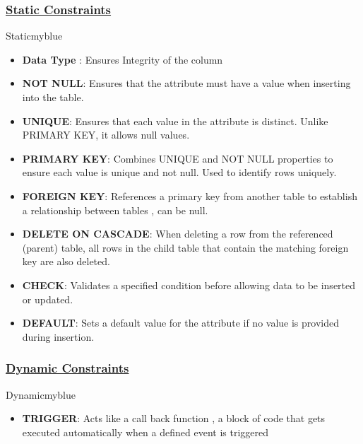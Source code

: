 \subsubsection{\underline{Static Constraints}}

\vspace{0.25cm}
\begin{prettyBox}{Static}{myblue}
\begin{itemize} 
\item \textbf{Data Type} : Ensures Integrity of the column
\item \textbf{NOT NULL}: Ensures that the attribute must have a value when inserting into the table.
\item \textbf{UNIQUE}: Ensures that each value in the attribute is distinct. Unlike PRIMARY KEY, it allows null values.
\item \textbf{PRIMARY KEY}: Combines UNIQUE and NOT NULL properties to ensure each value is unique and not null.
Used to identify rows uniquely. 
\item \textbf{FOREIGN KEY}: References a primary key from another table to establish a relationship between tables , can be null.
\item \textbf{DELETE ON CASCADE}: When deleting a row from the referenced (parent) table, all rows in the child table 
that contain the matching foreign key are also deleted.
\item \textbf{CHECK}: Validates a specified condition before allowing data to be inserted or updated. 
\item \textbf{DEFAULT}: Sets a default value for the attribute if no value is provided during insertion. 
\end{itemize}
\end{prettyBox}

\vspace{0.5cm}
\subsubsection{\underline{Dynamic Constraints}} 

\vspace{0.25cm}
\begin{prettyBox}{Dynamic}{myblue}
\begin{itemize} 
\item \textbf{TRIGGER}: Acts like a call back function , a block of code that gets executed automatically when 
a defined event is triggered
\end{itemize}
\end{prettyBox}

